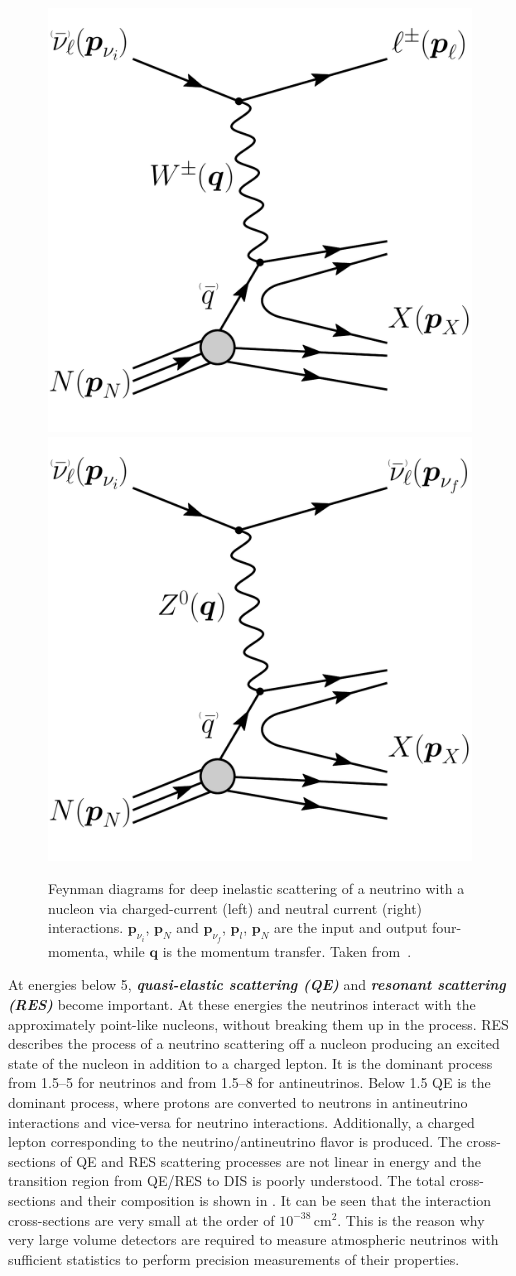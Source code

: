 \begin{figure}[h]
    \centering
    \includegraphics[width=0.4\linewidth]{figures/neutrinos_properties/feynman_DIS_CC_nu_new.pdf}
    \hspace{0.8cm}
    \includegraphics[width=0.4\linewidth]{figures/neutrinos_properties/feynman_DIS_NC_nu_new.pdf}
    \caption[Neutrino-nucleon deep inelastic scattering]{Feynman diagrams for deep inelastic scattering of a neutrino with a nucleon via charged-current (left) and neutral current (right) interactions. $\boldsymbol{p}_{\nu_i}$, $\boldsymbol{p}_{N}$ and $\boldsymbol{p}_{\nu_f}$, $\boldsymbol{p}_{l}$, $\boldsymbol{p}_{N}$ are the input and output four-momenta, while $\boldsymbol{q}$ is the momentum transfer. Taken from~\cite{ATerliuk}.}
\end{figure}

At energies below \SI{5}{\gev}, \textbf{\textit{quasi-elastic scattering (QE)}} and \textbf{\textit{resonant scattering (RES)}} become important. At these energies the neutrinos interact with the approximately point-like nucleons, without breaking them up in the process. RES describes the process of a neutrino scattering off a nucleon producing an excited state of the nucleon in addition to a charged lepton. It is the dominant process from \SIrange{1.5}{5}{\gev} for neutrinos and from \SIrange{1.5}{8}{\gev} for antineutrinos. Below \SI{1.5}{\gev} QE is the dominant process, where protons are converted to neutrons in antineutrino interactions and vice-versa for neutrino interactions. Additionally, a charged lepton corresponding to the neutrino/antineutrino flavor is produced. The cross-sections of QE and RES scattering processes are not linear in energy and the transition region from QE/RES to DIS is poorly understood. The total cross-sections and their composition is shown in . It can be seen that the interaction cross-sections are very small at the order of $10^{-38}\mathrm{\,cm}^2$. This is the reason why very large volume detectors are required to measure atmospheric neutrinos with sufficient statistics to perform precision measurements of their properties.

